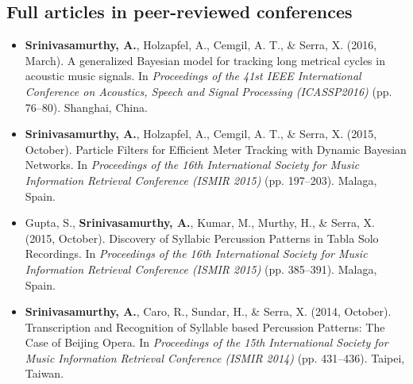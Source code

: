 \subsection*{Full articles in peer-reviewed conferences}
\begin{itemize}[leftmargin=*]
	\item \textbf{Srinivasamurthy, A.}, Holzapfel, A., Cemgil, A. T., \& Serra, X. (2016, March). A generalized Bayesian model for tracking long metrical cycles in acoustic music signals. In \emph{Proceedings of the 41st IEEE International Conference on Acoustics, Speech and Signal Processing (ICASSP2016)} (pp. 76--80). Shanghai, China. 
	\item \textbf{Srinivasamurthy, A.}, Holzapfel, A., Cemgil, A. T., \& Serra, X. (2015, October). Particle Filters for Efficient Meter Tracking with Dynamic Bayesian Networks. In \emph{Proceedings of the 16th International Society for Music Information Retrieval Conference (ISMIR 2015)} (pp. 197--203). Malaga, Spain. 
	\item Gupta, S., \textbf{Srinivasamurthy, A.}, Kumar, M., Murthy, H., \& Serra, X. (2015, October). Discovery of Syllabic Percussion Patterns in Tabla Solo Recordings. In \emph{Proceedings of the 16th International Society for Music Information Retrieval Conference (ISMIR 2015)} (pp. 385--391). Malaga, Spain. 
	\item \textbf{Srinivasamurthy, A.}, Caro, R., Sundar, H., \& Serra, X. (2014, October). Transcription and Recognition of Syllable based Percussion Patterns: The Case of Beijing Opera. In \emph{Proceedings of the 15th International Society for Music Information Retrieval Conference (ISMIR 2014)} (pp. 431--436). Taipei, Taiwan.  %

\end{itemize}
